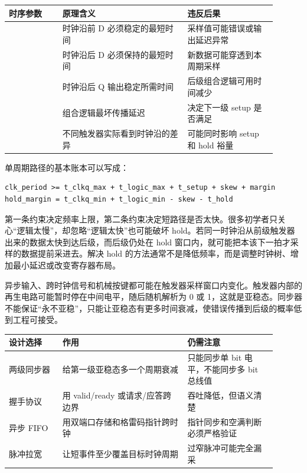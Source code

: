 \begin{longtable}{L{0.18\linewidth}L{0.42\linewidth}L{0.3\linewidth}}
\toprule
时序参数 & 原理含义 & 违反后果 \\
\midrule
{} & 时钟沿前 D 必须稳定的最短时间 & 采样值可能错误或输出延迟异常 \\
 & 时钟沿后 D 必须保持的最短时间 & 新数据可能穿透到本周期采样 \\
 & 时钟沿后 Q 输出稳定所需时间 & 后级组合逻辑可用时间减少 \\
 & 组合逻辑最坏传播延迟 & 决定下一级 setup 是否满足 \\
 & 不同触发器实际看到时钟沿的差异 & 可能同时影响 setup 和 hold 裕量 \\
\bottomrule
\end{longtable}

单周期路径的基本账本可以写成：

\begin{lstlisting}
clk_period >= t_clkq_max + t_logic_max + t_setup + skew + margin
hold_margin = t_clkq_min + t_logic_min - skew - t_hold
\end{lstlisting}

第一条约束决定频率上限，第二条约束决定短路径是否太快。很多初学者只关心“逻辑太慢”，却忽略“逻辑太快”也可能破坏 hold。若同一时钟沿从前级触发器出来的数据太快到达后级，而后级仍处在 hold 窗口内，就可能把本该下一拍才采样的数据提前采进去。解决 hold 的方法通常不是降低频率，而是调整时钟树、增加最小延迟或改变寄存器布局。

异步输入、跨时钟信号和机械按键都可能在触发器采样窗口内变化。触发器内部的再生电路可能暂时停在中间电平，随后随机解析为 0 或 1，这就是亚稳态。同步器不能保证“永不亚稳”，只能让亚稳态有更多时间衰减，使错误传播到后级的概率低到工程可接受。

\begin{longtable}{L{0.18\linewidth}L{0.42\linewidth}L{0.3\linewidth}}
\toprule
设计选择 & 作用 & 仍需注意 \\
\midrule
两级同步器 & 给第一级亚稳态多一个周期衰减 & 只能同步单 bit 电平，不能同步多 bit 总线值 \\
握手协议 & 用 valid/ready 或请求/应答跨边界 & 吞吐降低，但语义清楚 \\
异步 FIFO & 用双端口存储和格雷码指针跨时钟 & 指针同步和空满判断必须严格验证 \\
脉冲拉宽 & 让短事件至少覆盖目标时钟周期 & 过窄脉冲可能完全漏采 \\
\bottomrule
\end{longtable}

